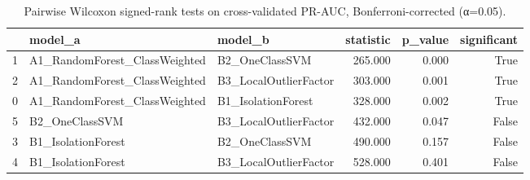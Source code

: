 \begin{table}[htbp]
\caption{Pairwise Wilcoxon signed-rank tests on cross-validated PR-AUC, Bonferroni-corrected (α=0.05).}
\label{tab:pairwise_wilcoxon}
\begin{tabular}{lllrrr}
\toprule
 & model\_a & model\_b & statistic & p\_value & significant \\
\midrule
1 & A1\_RandomForest\_ClassWeighted & B2\_OneClassSVM & 265.000 & 0.000 & True \\
2 & A1\_RandomForest\_ClassWeighted & B3\_LocalOutlierFactor & 303.000 & 0.001 & True \\
0 & A1\_RandomForest\_ClassWeighted & B1\_IsolationForest & 328.000 & 0.002 & True \\
5 & B2\_OneClassSVM & B3\_LocalOutlierFactor & 432.000 & 0.047 & False \\
3 & B1\_IsolationForest & B2\_OneClassSVM & 490.000 & 0.157 & False \\
4 & B1\_IsolationForest & B3\_LocalOutlierFactor & 528.000 & 0.401 & False \\
\bottomrule
\end{tabular}
\end{table}
